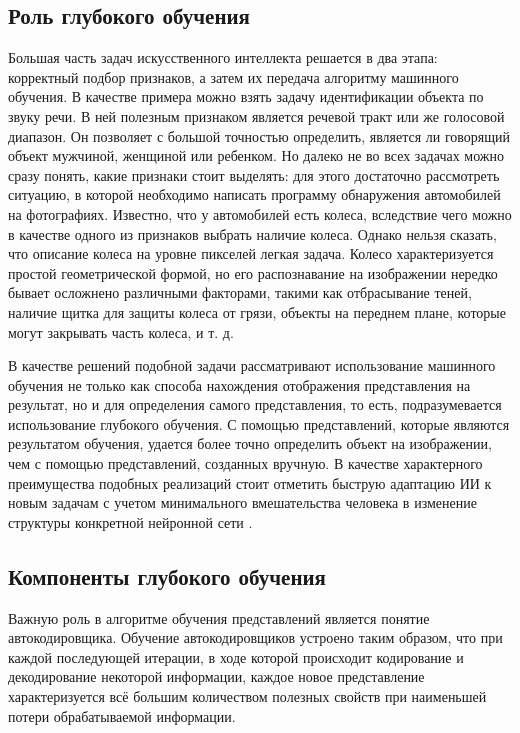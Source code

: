 \documentclass[bachelor, och, coursework]{SCWorks}
\begin{document}
    \subsection{Роль глубокого обучения}

        Большая часть задач искусственного интеллекта решается в два этапа: корректный подбор признаков, а затем их передача алгоритму машинного обучения. В качестве примера можно взять задачу идентификации объекта по звуку речи. В ней полезным признаком является речевой тракт или же голосовой диапазон. Он
        позволяет с большой точностью определить, является ли говорящий объект мужчиной, женщиной или
        ребенком.
        Но далеко не во всех задачах можно сразу понять, какие признаки стоит выделять: для этого достаточно рассмотреть ситуацию, в которой необходимо написать программу обнаружения автомобилей на фотографиях. Известно, что у автомобилей есть колеса, вследствие чего можно в качестве одного из признаков выбрать наличие колеса. Однако нельзя сказать, что описание колеса на уровне пикселей легкая задача.
        Колесо характеризуется простой геометрической формой, но его распознавание на изображении
        нередко бывает осложнено различными факторами, такими как отбрасывание теней, наличие щитка для защиты колеса от грязи, объекты на переднем плане, которые могут закрывать часть колеса, и т. д.

        В качестве решений подобной задачи рассматривают использование машинного обучения не только как способа нахождения отображения представления на результат, но и для определения самого представления, то есть, подразумевается использование глубокого обучения. С помощью представлений, которые являются результатом обучения, удается более точно определить объект на изображении, чем с помощью представлений, созданных вручную. В качестве характерного преимущества подобных реализаций стоит отметить быструю адаптацию ИИ к новым задачам с учетом минимального вмешательства человека в изменение структуры конкретной нейронной сети \cite{Gud}.

    \subsection{Компоненты глубокого обучения}

        Важную роль в алгоритме обучения представлений является понятие автокодировщика. Обучение автокодировщиков устроено таким образом, что при каждой последующей итерации, в ходе которой происходит кодирование и декодирование некоторой информации, каждое новое представление характеризуется всё большим количеством полезных свойств при наименьшей потери обрабатываемой информации.
\end{document}
